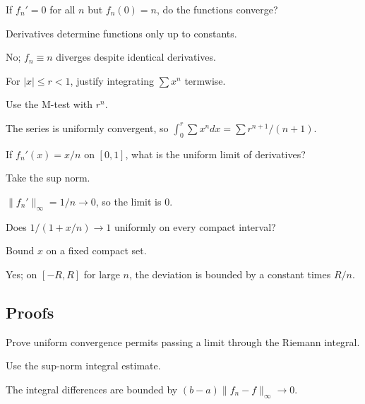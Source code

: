 \begin{exercise}\label{exr:ii12-expand-02}
If \(f_n'=0\) for all \(n\) but \(f_n(0)=n\), do the functions converge?
\end{exercise}
\begin{hint}
Derivatives determine functions only up to constants.
\end{hint}
\begin{solution}
No; \(f_n\equiv n\) diverges despite identical derivatives.
\end{solution}

\begin{exercise}\label{exr:ii12-expand-03}
For \(|x|\le r<1\), justify integrating \(\sum x^n\) termwise.
\end{exercise}
\begin{hint}
Use the M-test with \(r^n\).
\end{hint}
\begin{solution}
The series is uniformly convergent, so \(\int_0^r\sum x^n dx=\sum r^{n+1}/(n+1)\).
\end{solution}

\begin{exercise}\label{exr:ii12-expand-04}
If \(f_n'(x)=x/n\) on \([0,1]\), what is the uniform limit of derivatives?
\end{exercise}
\begin{hint}
Take the sup norm.
\end{hint}
\begin{solution}
\(\|f_n'\|_\infty=1/n\to0\), so the limit is \(0\).
\end{solution}

\begin{exercise}\label{exr:ii12-expand-05}
Does \(1/(1+x/n)\to1\) uniformly on every compact interval?
\end{exercise}
\begin{hint}
Bound \(x\) on a fixed compact set.
\end{hint}
\begin{solution}
Yes; on \([-R,R]\) for large \(n\), the deviation is bounded by a constant times \(R/n\).
\end{solution}

\subsection*{Proofs}

\begin{exercise}\label{exr:ii12-expand-06}
Prove uniform convergence permits passing a limit through the Riemann integral.
\end{exercise}
\begin{hint}
Use the sup-norm integral estimate.
\end{hint}
\begin{solution}
The integral differences are bounded by \((b-a)\|f_n-f\|_\infty\to0\).
\end{solution}

